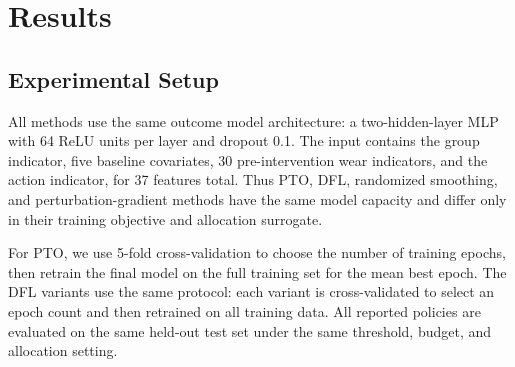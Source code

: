 \section{Results}

\subsection{Experimental Setup}
All methods use the same outcome model architecture: a two-hidden-layer MLP with 64 ReLU units per layer and dropout 0.1. The input contains the group indicator, five baseline covariates, 30 pre-intervention wear indicators, and the action indicator, for 37 features total. Thus PTO, DFL, randomized smoothing, and perturbation-gradient methods have the same model capacity and differ only in their training objective and allocation surrogate.

For PTO, we use 5-fold cross-validation to choose the number of training epochs, then retrain the final model on the full training set for the mean best epoch. The DFL variants use the same protocol: each variant is cross-validated to select an epoch count and then retrained on all training data. All reported policies are evaluated on the same held-out test set under the same threshold, budget, and allocation setting.
